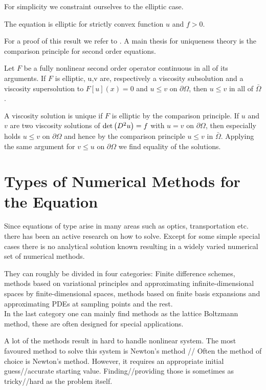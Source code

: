 For simplicity we constraint ourselves to the elliptic case. 
\begin{proposition}
	The \MA equation is elliptic for strictly convex function $u$ and $f > 0$.
\end{proposition}
For a proof of this result we refer to \cite{CC1995, GT1977}. A main thesis for uniqueness theory is the comparison principle for second order equations.

\begin{theorem}
	Let $F$ be a fully nonlinear second order operator continuous in all of its arguments.
	If $F$ is elliptic,	u,v are, respectively a viscosity subsolution and a viscosity supersolution to $F[u](x)=0$ and $u \leq v$ on $\partial \Omega$, then $u \leq v$ in all of $\bar \Omega$.
\end{theorem}

A viscosity solution is unique if $F$ is elliptic by the comparison principle. If $u$ and $v$ are two viscosity solutions of $\det{\left(D^2 u\right)}=f$ with $u=v$ on $\partial \Omega$, then especially holds $u \leq v$ on $\partial \Omega$ and hence by the comparison principle $u \leq v$ in  $\bar \Omega$. Applying the same argument for $v \leq u$ on $\partial \Omega$ we find equality of the solutions.


\section{Types of Numerical Methods for the \MA Equation}
Since equations of \MA type arise in many areas such as optics, transportation etc. there has been an active research on how to solve. Except for some simple special cases there is no analytical solution known resulting in a widely varied numerical set of numerical methods.

They can roughly be divided in four categories: Finite difference schemes, methods based on variational principles and approximating infinite-dimensional spaces by finite-dimensional spaces, methods based on finite basis expansions and approximating PDEs at sampling points and the rest. \\
In the last category one can mainly find methods as the lattice Boltzmann method, these are often designed for special applications.

A lot of the methods result in hard to handle nonlinear system. The most favoured method to solve this system is Newton's method // Often the method of choice is Newton's method. However, it requires an appropriate initial guess//accurate starting value. Finding//providing those is sometimes as tricky//hard as the problem itself.

